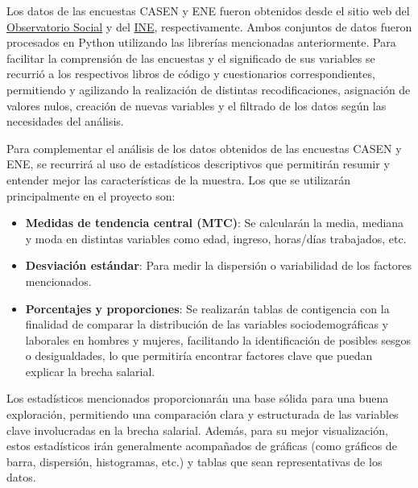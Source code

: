 

Los datos de las encuestas CASEN y ENE fueron obtenidos desde el sitio web del \href{https://observatorio.ministeriodesarrollosocial.gob.cl/encuesta-casen-2022}{Observatorio Social} y del \href{https://www.ine.gob.cl/estadisticas/sociales/mercado-laboral/ocupacion-y-desocupacion}{INE}, respectivamente. Ambos conjuntos de datos fueron procesados en Python utilizando las librerías mencionadas anteriormente. Para facilitar la comprensión de las encuestas y el significado de sus variables se recurrió a los respectivos libros de código y cuestionarios correspondientes, permitiendo y agilizando la realización de distintas recodificaciones, asignación de valores nulos, creación de nuevas variables y el filtrado de los datos según las necesidades del análisis. 

Para complementar el análisis de los datos obtenidos de las encuestas CASEN y ENE, se recurrirá al uso de estadísticos descriptivos que permitirán resumir y entender mejor las características de la muestra. Los que se utilizarán principalmente en el proyecto son:

\begin{itemize}
    \item \textbf{Medidas de tendencia central (MTC)}: Se calcularán la media, mediana y moda en distintas variables como edad, ingreso, horas/días trabajados, etc.
    \item \textbf{Desviación estándar}: Para medir la dispersión o variabilidad de los factores mencionados.
    \item \textbf{Porcentajes y proporciones}: Se realizarán tablas de contigencia con la finalidad de comparar la distribución de las variables sociodemográficas y laborales en hombres y mujeres, facilitando la identificación de posibles sesgos o desigualdades, lo que permitiría encontrar factores clave que puedan explicar la brecha salarial.
\end{itemize}

Los estadísticos mencionados proporcionarán una base sólida para una buena exploración, permitiendo una comparación clara y estructurada de las variables clave involucradas en la brecha salarial. Además, para su mejor visualización, estos estadísticos irán generalmente acompañados de gráficas (como gráficos de barra, dispersión, histogramas, etc.) y tablas que sean representativas de los datos.

